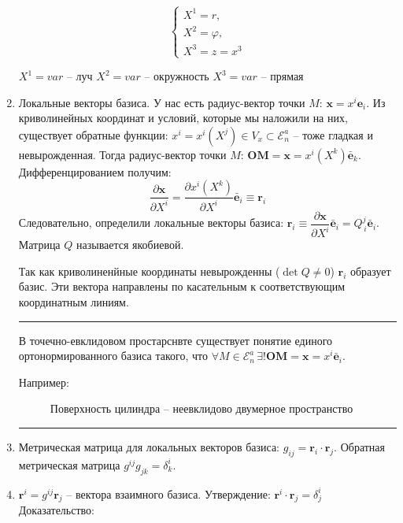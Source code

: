 \begin{enumerate}
\begin{example}
		\[
		\begin{cases}
			X^1 = r, \\
			X^2 = \varphi, \\
			X^3 = z = x^3
		\end{cases}
		\]
		
		$X^1 = var$ -- луч
		$X^2 = var$ -- окружность
		$X^3 = var$ -- прямая
	\end{example}
    

  \item Локальные векторы базиса. У нас есть радиус-вектор точки $M$: $\mathbf{x} = x^i \mathbf{e}_i$. 
    Из криволинейных координат и условий, которые мы наложили на них, существует обратные функции:
    $x^i = x^i(X^j) \in V_x \subset \mathcal{E}_n^a$ -- тоже гладкая и невырожденная. Тогда 
    радиус-вектор точки $M$: $\mathbf{OM} = \mathbf{x} = x^i(X^k) \bar{\mathbf{e}}_k$. Дифференцированием
    получим:
    \[
      \dfrac{\partial \mathbf{x}}{\partial X^i} = \dfrac{\partial x^i (X^k)}{\partial X^i} \bar{\mathbf{e}}_i
      \equiv \mathbf{r}_i
    \]
    Следовательно, определили локальные векторы базиса: 
    $\mathbf{r}_i \equiv \dfrac{\partial \mathbf{x}}{\partial X^i} \bar{\mathbf{e}}_i
    = Q^j_{\, i} \bar{\mathbf{e}}_i$. Матрица $Q$ называется якобиевой.

    Так как криволиненйные координаты невырожденны ($\det Q \neq 0$) $\mathbf{r}_i$ образует 
    базис. Эти вектора направлены по касательным к соответствующим координатным линиям.
    
	\rule{0.95\textwidth}{0.4pt}
	
    В точечно-евклидовом простарснвте существует понятие единого ортонормированного базиса такого,
    что $\forall M \in \mathcal{E}_n^a \, \exists! \mathbf{OM} = \mathbf{x} = x^i \bar{\mathbf{e}}_i$.
    
    \begin{example} \label{cilinder_surface}
    	Например:
    	\begin{figure}[H]
    		\centering
    		
    		\caption{Поверхность цилиндра -- неевклидово двумерное пространство}
    	\end{figure}
    \end{example}
    
    \rule{0.95\textwidth}{0.4pt}

  \item Метрическая матрица для локальных векторов базиса: $g_{ij} = \mathbf{r}_i \cdot \mathbf{r}_j$. 
    Обратная метрическая матрица $g^{ij} g_{jk} = \delta^i_k$.

  \item $\mathbf{r}^i = g^{ij} \mathbf{r}_j$ -- вектора взаимного базиса.
    Утверждение: $\mathbf{r}^i \cdot \mathbf{r}_j = \delta^i_j$
    Доказательство: 
\end{enumerate}

